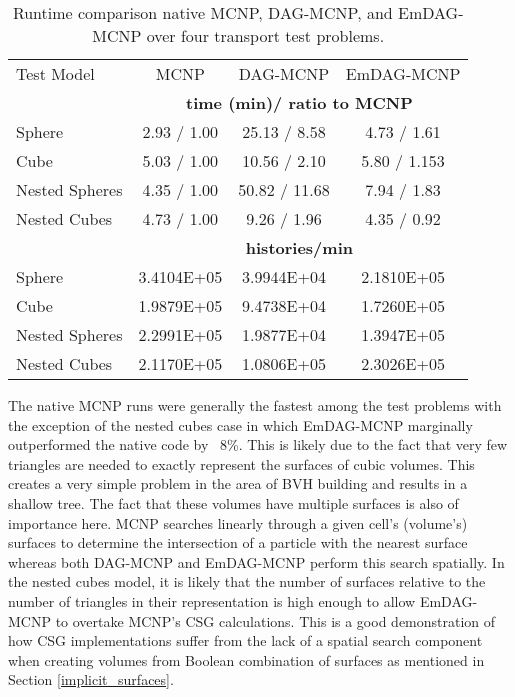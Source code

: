 \begin{table}[H]
  \small
  \begin{center}

      \label{timings}
    \begin{tabular}{lccc}

      \toprule
      Test Model & MCNP & DAG-MCNP & EmDAG-MCNP \\
      & \multicolumn{3}{c}{\textbf{time (min)/ ratio to MCNP}} \\
      \hline
      Sphere & 2.93 / 1.00 & 25.13 / 8.58  & 4.73 / 1.61  \\
      Cube & 5.03 / 1.00 & 10.56 / 2.10 & 5.80 / 1.153 \\
      Nested Spheres & 4.35 / 1.00  & 50.82 / 11.68  & 7.94 / 1.83 \\
      Nested Cubes & 4.73 / 1.00 & 9.26 / 1.96 & 4.35 / 0.92 \\
      &  \multicolumn{3}{c}{\textbf{histories/min}} \\
      \hline
      Sphere & 3.4104E+05  & 3.9944E+04  & 2.1810E+05   \\
      Cube & 1.9879E+05 & 9.4738E+04 & 1.7260E+05 \\
      Nested Spheres & 2.2991E+05 & 1.9877E+04 & 1.3947E+05 \\
      Nested Cubes & 2.1170E+05 & 1.0806E+05 & 2.3026E+05 \\
      \bottomrule
      
    \end{tabular}
  \end{center}
  \caption{Runtime comparison native MCNP, DAG-MCNP, and EmDAG-MCNP over four
    transport test problems.}
  
\end{table}

The native MCNP runs were generally the fastest among the test problems with the
exception of the nested cubes case in which EmDAG-MCNP marginally outperformed
the native code by ~8\%. This is likely due to the fact that very few triangles
are needed to exactly represent the surfaces of cubic volumes. This creates a
very simple problem in the area of BVH building and results in a shallow
tree. The fact that these volumes have multiple surfaces is also of importance
here. MCNP searches linearly through a given cell's (volume's) surfaces to
determine the intersection of a particle with the nearest surface whereas both
DAG-MCNP and EmDAG-MCNP perform this search spatially. In the nested cubes
model, it is likely that the number of surfaces relative to the number of
triangles in their representation is high enough to allow EmDAG-MCNP to overtake
MCNP's CSG calculations. This is a good demonstration of how CSG implementations
suffer from the lack of a spatial search component when creating volumes from
Boolean combination of surfaces as mentioned in Section \ref{implicit_surfaces}.

